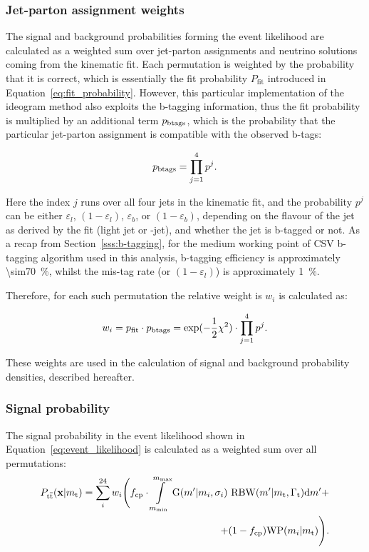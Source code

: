 \subsubsection*{Jet-parton assignment weights}
The signal and background probabilities forming the event likelihood are calculated as a weighted sum over jet-parton
assignments and neutrino solutions coming from the kinematic fit. Each permutation is weighted by the probability that
it is correct, which is essentially the fit probability $P_{\textrm{fit}}$ introduced in
Equation~\ref{eq:fit_probability}. However, this particular implementation of the ideogram method also exploits the
b-tagging information, thus the fit probability is multiplied by an additional term $p_{\rm btags}$, which is the
probability that the particular jet-parton assignment is compatible with the observed b-tags:

\begin{equation}
p_{\rm btags} = \prod_{j=1}^{4} p^{j}.
\end{equation}

Here the index $j$ runs over all four jets in the kinematic fit, and the probability $p^{j}$ can be either
$\varepsilon_{l}$, $(1 - \varepsilon_{l})$, $\varepsilon_{b}$, or $(1 - \varepsilon_{b})$, depending on the flavour of
the jet as derived by the fit (light jet or \cPqb-jet), and whether the jet is b-tagged or not. As a recap from
Section~\ref{sss:b-tagging}, for the medium working point of CSV b-tagging algorithm used in this analysis, b-tagging
efficiency is approximately \SI{\sim70}{\percent}, whilst the mis-tag rate (or $(1 - \varepsilon_{l})$) is approximately
\SI{1}{\percent}.

Therefore, for each such permutation the relative weight is $w_i$ is calculated as:

\begin{equation}
w_i = p_{\rm fit} \cdot p_{\rm btags} = \textrm{exp}(-\frac{1}{2}\chi^2) \cdot \prod_{j=1}^{4} p^{j}.
\label{eq:permutation_weight}
\end{equation}

These weights are used in the calculation of signal and background probability densities, described hereafter.

\subsubsection*{Signal probability}

The \ttbar signal probability in the event likelihood shown in Equation~\ref{eq:event_likelihood} is calculated as a
weighted sum over all permutations:
\begin{equation}
\begin{split}
P_{\mathrm{t}\overline{\mathrm{t}}}(\mathbf{x}|m_\mathrm{t}) = \sum_{i}^{24} w_{i} \Biggl( f_{\textrm{cp}} \cdot
\int\limits^{m_{\textrm{max}}}_{m_{\textrm{min}}} \textrm{G}(m'|m_{i},\sigma_{i}) ~\textrm{RBW}
(m'|m_\mathrm{t},\Gamma_{\textrm{t}}) \textrm{d}m' +  \\  + (1 -
f_{\textrm{cp}})\textrm{WP}(m_{i}|m_\mathrm{t}) \Biggr).
\end{split}
\end{equation}

